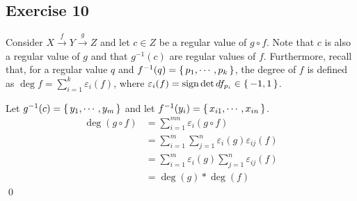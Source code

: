 \documentclass{article}
\begin{document}
  \subsection*{Exercise 10}
    Consider $X\xrightarrow{f}Y\xrightarrow{g}Z$ and let $c\in Z$ be a regular
    value of $g\circ f$. Note that $c$ is also a regular value of $g$ and that
    $g^{-1}(c)$ are regular values of $f$. Furthermore, recall that, for a
    regular value $q$ and $f^{-1}(q)=\set{p_1,\cdots,p_k}$, the degree of $f$ is
    defined as $\deg f=\sum_{i=1}^k\varepsilon_i(f)$, where $\varepsilon_i(f)=
    \text{sign}\det df_{p_i}\in\set{-1,1}$.

    Let $g^{-1}(c)=\set{y_1,\cdots,y_m}$ and let $f^{-1}(y_i)=\set{x_{i1},\cdots,
    x_{in}}$.
    \begin{align*}
      \deg(g\circ f)
        &=\sum_{i=1}^{mn}\varepsilon_i(g\circ f)\\
        &=\sum_{i=1}^m\sum_{j=1}^n\varepsilon_i(g)\varepsilon_{ij}(f)\\
        &=\sum_{i=1}^m\varepsilon_i(g)\sum_{j=1}^n\varepsilon_{ij}(f)\\
        &=\deg(g)*\deg(f)
    \end{align*}
    \qed
\end{document}
